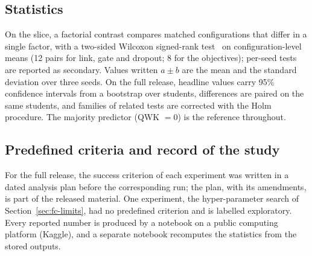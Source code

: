 \subsection{Statistics}
On the slice, a factorial contrast compares matched configurations that differ in a single factor, with a two-sided Wilcoxon signed-rank test~\cite{wilcoxon1945} on configuration-level means (12 pairs for link, gate and dropout; 8 for the objectives); per-seed tests are reported as secondary. Values written $a\pm b$ are the mean and the standard deviation over three seeds. On the full release, headline values carry 95\% confidence intervals from a bootstrap over students, differences are paired on the same students, and families of related tests are corrected with the Holm procedure. The majority predictor (QWK $=0$) is the reference throughout.

\subsection{Predefined criteria and record of the study}
For the full release, the success criterion of each experiment was written in a dated analysis plan before the corresponding run; the plan, with its amendments, is part of the released material. One experiment, the hyper-parameter search of Section~\ref{sec:fc-limits}, had no predefined criterion and is labelled exploratory. Every reported number is produced by a notebook on a public computing platform (Kaggle), and a separate notebook recomputes the statistics from the stored outputs.
